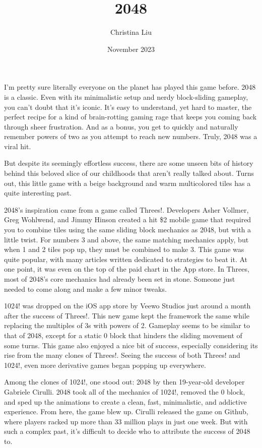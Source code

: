 \documentclass{article}
\title{2048}
\author{Christina Liu}
\date{November 2023}
\begin{document}
\maketitle
I’m pretty sure literally everyone on the planet has played this game before. 2048 is a classic. Even with its minimalistic setup and nerdy block-sliding gameplay, you can’t doubt that it’s iconic. It’s easy to understand, yet hard to master, the perfect recipe for a kind of brain-rotting gaming rage that keeps you coming back through sheer frustration. And as a bonus, you get to quickly and naturally remember powers of two as you attempt to reach new numbers. Truly, 2048 was a viral hit.

But despite its seemingly effortless success, there are some unseen bits of history behind this beloved slice of our childhoods that aren’t really talked about. Turns out, this little game with a beige background and warm multicolored tiles has a quite interesting past.
\newline

2048’s inspiration came from a game called Threes!. Developers Asher Vollmer, Greg Wohlwend, and Jimmy Hinson created a hit \$2 mobile game that required you to combine tiles using the same sliding block mechanics as 2048, but with a little twist. For numbers 3 and above, the same matching mechanics apply, but when 1 and 2 tiles pop up, they must be combined to make 3. This game was quite popular, with many articles written dedicated to strategies to beat it. At one point, it was even on the top of the paid chart in the App store. In Threes, most of 2048’s core mechanics had already been set in stone. Someone just needed to come along and make a few minor tweaks.

1024! was dropped on the iOS app store by Veewo Studios just around a month after the success of Threes!. This new game kept the framework the same while replacing the multiples of 3s with powers of 2. Gameplay seems to be similar to that of 2048, except for a static 0 block that hinders the sliding movement of some turns. This game also enjoyed a nice bit of success, especially considering its rise from the many clones of Threes!. Seeing the success of both Threes! and 1024!, even more derivative games began popping up everywhere.

Among the clones of 1024!, one stood out: 2048 by then 19-year-old developer Gabriele Cirulli. 2048 took all of the mechanics of 1024!, removed the 0 block, and sped up the animations to create a clean, fast, minimalistic, and addictive experience. From here, the game blew up. Cirulli released the game on Github, where players racked up more than 33 million plays in just one week. But with such a complex past, it’s difficult to decide who to attribute the success of 2048 to.
\end{document}
